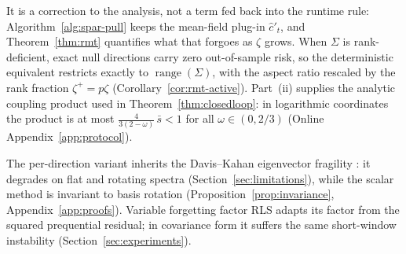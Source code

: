 \documentclass[twoside,11pt]{article}
\begin{document}
It is a correction to the analysis, not a term fed back into the runtime rule: Algorithm~\ref{alg:spar-pull} keeps the mean-field plug-in $\hat c'_t$, and Theorem~\ref{thm:rmt} quantifies what that forgoes as $\zeta$ grows.
When $\Sigma$ is rank-deficient, exact null directions carry zero out-of-sample risk, so the deterministic equivalent restricts exactly to $\operatorname{range}(\Sigma)$, with the aspect ratio rescaled by the rank fraction $\zeta^+ = p\zeta$ (Corollary~\ref{cor:rmt-active}).
Part~(ii) supplies the analytic coupling product used in Theorem~\ref{thm:closedloop}: in logarithmic coordinates the product is at most $\tfrac{4}{3(2-\omega)}\,\bar s < 1$ for all $\omega \in (0, 2/3)$ (Online Appendix~\ref{app:protocol}).

The per-direction variant inherits the Davis--Kahan eigenvector fragility \citep{davis1970,wedin1972}: it degrades on flat and rotating spectra (Section~\ref{sec:limitations}), while the scalar method is invariant to basis rotation (Proposition~\ref{prop:invariance}, Appendix~\ref{app:proofs}).
Variable forgetting factor RLS \citep{fortescue1981,paleologu2008} adapts its factor from the squared prequential residual; in covariance form it suffers the same short-window instability (Section~\ref{sec:experiments}).
\end{document}

